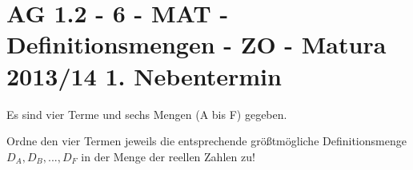 \section{AG 1.2 - 6 - MAT - Definitionsmengen - ZO - Matura 2013/14 1. Nebentermin}

\begin{beispiel}[AG 1.2]{1} %
				Es sind vier Terme und sechs Mengen (A bis F) gegeben.
				
				Ordne den vier Termen jeweils die entsprechende größtmögliche Definitionsmenge $D_A, D_B, ... , D_F$ in der Menge der reellen Zahlen zu!\leer
				
				\zuordnen{
								R1={$\ln(x+1)$},				%
								R2={$\sqrt{1-x}$},				%
								R3={$\frac{2x}{x\cdot(x+1)^2}$},				%
								R4={$\frac{2x}{x^2+1}$},				%
								A={$D_A=\mathbb{R}$}, 				%
								B={$D_B=(1;\infty)$}, 				%
								C={$D_C=(-1;\infty)$}, 				%
								D={$D_D=\mathbb{R}\backslash\left\{-1;0\right\}$}, 				%
								E={$D_E=(-\infty;1)$}, 				%
								F={$D_F=(-\infty;1]$}, 				%
								A1={C},				%
								A2={F},				%
								A3={D},				%
								A4={A},				%
								}
\end{beispiel}